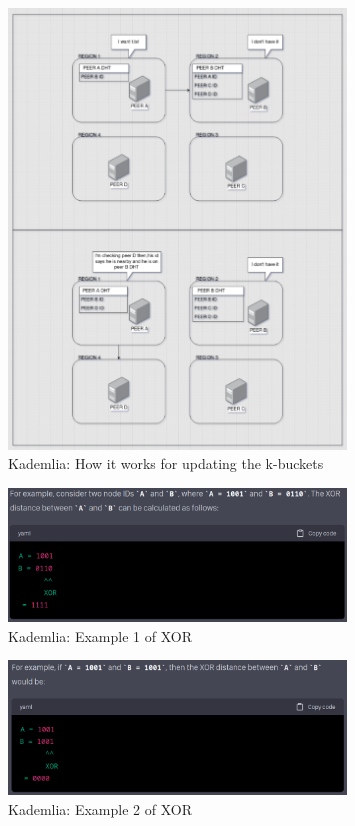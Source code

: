 \begin{figure}[H]
    \centering
    \includegraphics[width=0.8\textwidth]{assets/use-case-1/DHT.png} %
    \caption{Kademlia: How it works for updating the k-buckets}
    \label{fig:sample-image} 
\end{figure}

\begin{figure}[H]
    \centering
    \includegraphics[width=0.8\textwidth]{assets/use-case-1/XOR1.png} %
    \caption{Kademlia: Example 1 of XOR}
    \label{fig:sample-image} 
\end{figure}

\begin{figure}[H]
    \centering
    \includegraphics[width=0.8\textwidth]{assets/use-case-1/XOR2.png} %
    \caption{Kademlia: Example 2 of XOR}
    \label{fig:sample-image} 
\end{figure}


